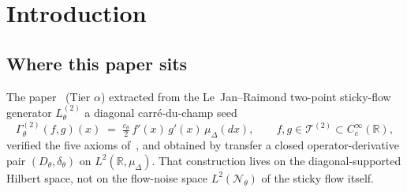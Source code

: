 \documentclass[11pt,reqno]{amsart}
\theoremstyle{plain}
\theoremstyle{definition}
\theoremstyle{remark}
\newcommand{\R}{\mathbb R}
\newcommand{\Prob}{\mathbb P}
\newcommand{\Dom}{\mathrm{Dom}}
\newcommand{\cF}{\mathcal F}
\newcommand{\cN}{\mathcal N}
\newcommand{\cT}{\mathcal T}
\newcommand{\cU}{\mathcal U}
\newcommand{\FT}{\cF_{T}^{\,\mathrm{1t}}}
\newcommand{\Hone}{L^{2}(\Omega,\FT,\Pth)}
\newcommand{\GamN}{\Gamma^{(2)}_{\cN_{\theta}}}
\newcommand{\GamT}{\Gamma^{(2)}_{\theta}}
\newcommand{\Lth}[1]{L^{(#1)}_{\theta}}
\newcommand{\DN}{D_{\cN_{\theta}}}
\newcommand{\divN}{\delta_{\cN_{\theta}}}
\newcommand{\Dth}{D_{\theta}}
\newcommand{\divth}{\delta_{\theta}}
\newcommand{\Pth}{\Prob_{\theta}}
\begin{document}
\begin{abstract}
Conditional on Hypothesis~$\beta$-1 (equivalently on
{\normalfont (P1)}, {\normalfont (P2)}, {\normalfont (P3)}, or
a fortiori on {\normalfont (P1)}, {\normalfont (P2)},
{\normalfont (P3')}), the transfer theorem
of~\cite{GammaHierarchyDivergence} produces a closed
densely-defined operator-derivative pair
\[
  \DN\colon\Dom(\DN)\subset\Hone\longrightarrow\cU_{\GamN},
  \qquad
  \divN=\DN^{*},
\]
on the time-$T$ single-time sub-Hilbert space
$\Hone\subseteq L^{2}(\cN_{\theta})$, satisfying the
integration-by-parts identity (\cref{thm:transfer-cyl,cor:transfer-P}).
The multi-time extension to a pair on $L^{2}(\cN_{\theta})$
requires a strictly stronger multi-time form-closability
hypothesis (\cref{rem:multi-time-formclos,rem:transfer-multi})
and is not asserted in the main theorem. The lifted seed is consistent with
the Tier $\alpha$ diagonal seed on the diagonal stratum of
two-point observables (\cref{thm:consistency}).

This is a Tier $\beta$ result. We do not claim a flow-noise
construction over the Brownian web, two-dimensional critical
percolation, or any other black noise outside LJR; we do not claim
the Leibniz defect of $\DN$ detects blackness of $\cN_{\theta}$; and
we do not claim a path-space Malliavin realization of
$(\DN,\divN)$.
\end{abstract}

\maketitle

\section{Introduction}\label{sec:intro}

\subsection{Where this paper sits}\label{sec:intro-where}

The paper~\cite{StickyFlowGammaSeed} (Tier $\alpha$) extracted from
the Le~Jan--Raimond two-point sticky-flow generator $\Lth{2}$ a
diagonal carr\'e-du-champ seed
\begin{equation}\label{eq:tier-alpha-seed}
  \GamT(f,g)(x)
  \;=\;\tfrac{c_{\theta}}{2}\,f'(x)\,g'(x)\,\mu_{\Delta}(dx),
  \qquad f,g\in\cT^{(2)}\subset C_{c}^{\infty}(\R),
\end{equation}
verified the five axioms of~\cite{GammaHierarchyDivergence}, and
obtained by transfer a closed operator-derivative pair
$(\Dth,\divth)$ on $L^{2}(\R,\mu_{\Delta})$. That construction lives
on the diagonal-supported Hilbert space, not on the flow-noise space
$L^{2}(\cN_{\theta})$ of the sticky flow itself.
\end{document}
